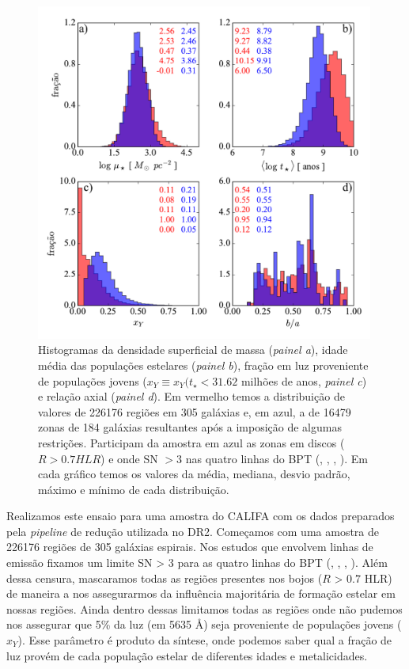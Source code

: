 \begin{figure}
	\centering
	\includegraphics[width=0.99\textwidth]{figuras/histosample.pdf}
	\caption[Histogramas: densidade superficial de massa, idade média, fração de populações jovens e
	relação axial.]
	{Histogramas da densidade superficial de massa ({\em painel a}), idade média das populações estelares ({\em painel b}), fração em luz proveniente de populações jovens ($x_Y \equiv x_Y(t_\star < 31.62$ milhões de anos, {\em painel c}) e relação axial ({\em painel d}). Em vermelho temos a distribuição de valores de 226176 regiões em 305 galáxias e, em azul, a de 16479 zonas de 184 galáxias resultantes após a imposição de algumas restrições. Participam da amostra em azul as zonas em discos ($R > 0.7 HLR$) e onde SN $>3$ nas quatro linhas do BPT (\Hb, \oiii, \Ha, \nii). Em cada gráfico temos os valores da média, mediana, desvio padrão, máximo e mínimo de cada distribuição.}
	\label{fig:histosample}
\end{figure}

Realizamos este ensaio para uma amostra do CALIFA com os dados preparados pela {\em pipeline} de redução utilizada no DR2. Começamos com uma amostra de 226176 regiões de 305 galáxias espirais. Nos estudos que envolvem linhas de emissão fixamos um limite SN > 3 para as quatro linhas do BPT (\Hb, \oiii, \Ha, \nii).
Além dessa censura, mascaramos todas as regiões presentes nos bojos ($R$ > 0.7 HLR) de maneira a nos assegurarmos da influência majoritária de formação estelar em nossas regiões. Ainda dentro dessas limitamos todas as regiões onde não pudemos nos assegurar que 5\% da luz (em 5635 \AA) seja proveniente de populações jovens ($x_Y$). Esse parâmetro é produto da síntese, onde podemos saber qual a fração de luz provém de cada população estelar de diferentes idades e metalicidades.

